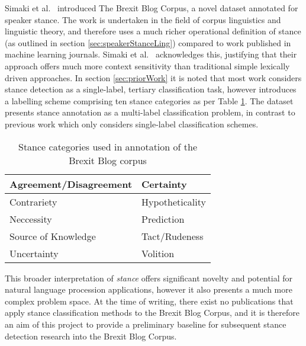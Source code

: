 \documentclass[Dissertation.tex]{subfiles}
\begin{document}
Simaki et al.\ \cite{simakiAnnotatingSpeakerStance2017} introduced The Brexit Blog Corpus, a novel dataset annotated for speaker stance. The work is undertaken in the field of corpus linguistics and linguistic theory, and therefore uses a much richer operational definition of stance (as outlined in section \ref{sec:speakerStanceLing}) compared to work published in machine learning journals. Simaki et al.\ \cite{simakiAnnotatingSpeakerStance2017} acknowledges this, justifying that their approach offers much more context sensitivity than traditional simple lexically driven approaches. In section \ref{sec:priorWork} it is noted that most work considers stance detection as a single-label, tertiary classification task, however \cite{simakiAnnotatingSpeakerStance2017} introduces a labelling scheme comprising ten stance categories as per Table \ref{tab:stanceCats}. The dataset presents stance annotation as a multi-label classification problem, in contrast to previous work which only considers single-label classification schemes. 

{\renewcommand{\arraystretch}{1.5}
	
	\begin{table}[h]
		\caption{Stance categories used in annotation of the Brexit Blog corpus \cite{simakiAnnotatingSpeakerStance2017}}
		\label{tab:stanceCats}
		\small\scshape 
		\centering
		\begin{tabular}{|l|l|}
			\hline
			Agreement/Disagreement & Certainty       \\ \hline
			Contrariety            & Hypotheticality \\ \hline
			Neccessity             & Prediction      \\ \hline
			Source of Knowledge    & Tact/Rudeness   \\ \hline
			Uncertainty            & Volition        \\ \hline
		\end{tabular}
		
\end{table}}

This broader interpretation of \textit{stance} offers significant novelty and potential for natural language procession applications, however it also presents a much more complex problem space. At the time of writing, there exist no publications that apply stance classification methods to the Brexit Blog Corpus, and it is therefore an aim of this project to provide a preliminary baseline for subsequent stance detection research into the Brexit Blog Corpus.
\end{document}
